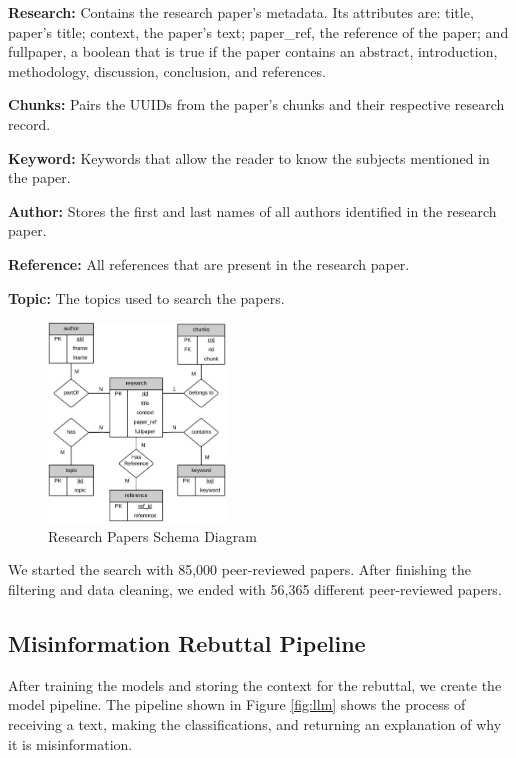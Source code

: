 \begin{description}
	\item{\textbf{Research:}}  Contains the research paper's metadata. Its attributes are: title, paper's title; context, the paper’s text; paper\_ref, the reference of the paper; and fullpaper, a boolean that is true if the paper contains an abstract, introduction, methodology, discussion, conclusion, and references.
	\item{\textbf{Chunks:}} Pairs the UUIDs from the paper's chunks and their respective research record.  
	\item{\textbf{Keyword:}} Keywords that allow the reader to know the subjects mentioned in the paper. 
	\item{\textbf{Author:}} Stores the first and last names of all authors identified in the research paper. 
	\item{\textbf{Reference:}} All references that are present in the research paper.
	\item{\textbf{Topic:}} The topics used to search the papers.

\end{description}

\begin{figure}[!ht]
	\begin{center}
		\includegraphics[width=0.42\textwidth]{figures/Table_diagram.jpeg} %
	\end{center}
	\caption{Research Papers Schema Diagram} %
	\label{fig:table}
\end{figure}


We started the search with 85,000 peer-reviewed papers. After finishing the filtering and data cleaning, we ended with 56,365 different peer-reviewed papers. 



\subsection{Misinformation Rebuttal Pipeline}
After training the models and storing the context for the rebuttal, we create the model pipeline. The pipeline shown in Figure \ref{fig:llm} shows the process of receiving a text, making the classifications, and returning an explanation of why it is misinformation.

